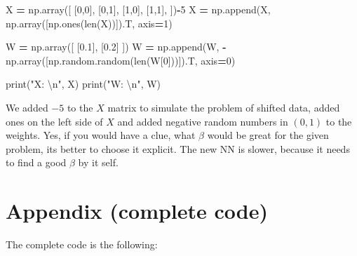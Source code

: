 \documentclass[
]{book}
\newenvironment{Shaded}{\begin{snugshade}}{\end{snugshade}}
\newcommand{\BuiltInTok}[1]{#1}
\newcommand{\CharTok}[1]{\textcolor[rgb]{0.31,0.60,0.02}{#1}}
\newcommand{\DecValTok}[1]{\textcolor[rgb]{0.00,0.00,0.81}{#1}}
\newcommand{\FloatTok}[1]{\textcolor[rgb]{0.00,0.00,0.81}{#1}}
\newcommand{\NormalTok}[1]{#1}
\newcommand{\OperatorTok}[1]{\textcolor[rgb]{0.81,0.36,0.00}{\textbf{#1}}}
\newcommand{\StringTok}[1]{\textcolor[rgb]{0.31,0.60,0.02}{#1}}
\begin{document}
\begin{Shaded}
\begin{Highlighting}[]
\NormalTok{X }\OperatorTok{=}\NormalTok{ np.array([}
\NormalTok{  [}\DecValTok{0}\NormalTok{,}\DecValTok{0}\NormalTok{],}
\NormalTok{  [}\DecValTok{0}\NormalTok{,}\DecValTok{1}\NormalTok{],}
\NormalTok{  [}\DecValTok{1}\NormalTok{,}\DecValTok{0}\NormalTok{],}
\NormalTok{  [}\DecValTok{1}\NormalTok{,}\DecValTok{1}\NormalTok{],}
\NormalTok{])}\OperatorTok{{-}}\DecValTok{5}
\NormalTok{X }\OperatorTok{=}\NormalTok{ np.append(X, np.array([np.ones(}\BuiltInTok{len}\NormalTok{(X))]).T, axis}\OperatorTok{=}\DecValTok{1}\NormalTok{)}

\NormalTok{W }\OperatorTok{=}\NormalTok{ np.array([}
\NormalTok{  [}\FloatTok{0.1}\NormalTok{], }
\NormalTok{  [}\FloatTok{0.2}\NormalTok{]}
\NormalTok{])}
\NormalTok{W }\OperatorTok{=}\NormalTok{ np.append(W, }\OperatorTok{{-}}\NormalTok{np.array([np.random.random(}\BuiltInTok{len}\NormalTok{(W[}\DecValTok{0}\NormalTok{]))]).T, axis}\OperatorTok{=}\DecValTok{0}\NormalTok{)}

\BuiltInTok{print}\NormalTok{(}\StringTok{"X: }\CharTok{\textbackslash{}n}\StringTok{"}\NormalTok{, X)}
\BuiltInTok{print}\NormalTok{(}\StringTok{"W: }\CharTok{\textbackslash{}n}\StringTok{"}\NormalTok{, W)}
\end{Highlighting}
\end{Shaded}

We added \(-5\) to the \(X\) matrix to simulate the problem of shifted data, added ones on the left side of \(X\) and added negative random numbers in \((0,1)\) to the weights. Yes, if you would have a clue, what \(\beta\) would be great for the given problem, its better to choose it explicit. The new NN is slower, because it needs to find a good \(\beta\) by it self.

\hypertarget{appendix-complete-code-1}{%
\section{Appendix (complete code)}\label{appendix-complete-code-1}}

The complete code is the following:
\end{document}

